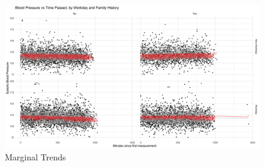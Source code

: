 \documentclass[12pt,twoside,letterpaper]{article}
\theoremstyle{definition}
\theoremstyle{definition}
\newcommand{\detailtexcount}[1]{ %
\immediate\write18{texcount -merge -sum #1.tex > #1.wcdetail }%
%
}
\begin{document}
\begin{appendices}
    \begin{figure} 
    \centering
    \includegraphics[width=\textwidth]{pics/marginal trend.png}
    \caption{Marginal Trends}
    \label{fig: marginal trend}
    \end{figure}
\end{appendices}


\end{document}
